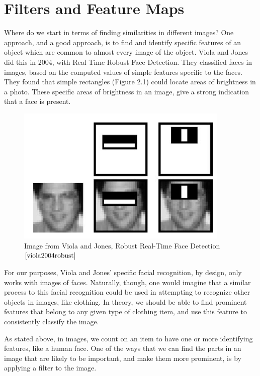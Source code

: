 \documentclass[12pt]{report} %
\begin{document}
 \chapter{Filters and Feature Maps}

	Where do we start in terms of finding similarities in different images? One approach, and a good approach, is to find and identify specific features of an object which are common to almost every image of the object. Viola and Jones did this in 2004, with Real-Time Robust Face Detection. They classified faces in images, based on the computed values of simple features specific to the faces\cite{viola2004robust}. They found that simple rectangles (Figure 2.1) could locate areas of brightness in a photo. These specific areas of brightness in an image,  give a strong indication that a face is present.

\begin{figure}
\centering
\includegraphics[width=4in]{ViolaJonesFace} 
\caption[Viola and Jones Face Detection Rectangles]
	{Image from Viola and Jones, Robust Real-Time Face Detection$\cite{viola2004robust}$}
\end{figure}

	For our purposes, Viola and Jones' specific facial recognition, by design, only works with images of faces. Naturally, though, one would imagine that a similar process to this facial recognition could be used in attempting to recognize other objects in images, like clothing. In theory, we should be able to find prominent features that belong to any given type of clothing item, and use this feature to consistently classify the image.
		
	 As stated above, in images, we count on an item to have one or more identifying features, like a human face. One of the ways that we can find the parts in an image that are likely to be important, and make them more prominent, is by applying a filter to the image. 
\end{document}
